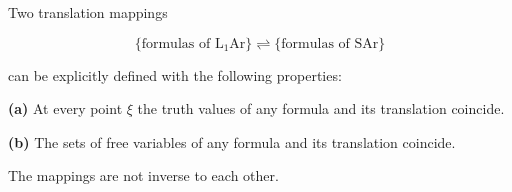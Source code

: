 Two translation mappings

$$\{ \text{formulas of } \mathrm{L}_1\mathrm{Ar} \} \rightleftharpoons \{ \text{formulas of SAr} \}$$

can be explicitly defined with the following properties:

\textbf{(a)} At every point $\xi$ the truth values of any formula and its translation coincide.

\textbf{(b)} The sets of free variables of any formula and its translation coincide.

The mappings are not inverse to each other.
